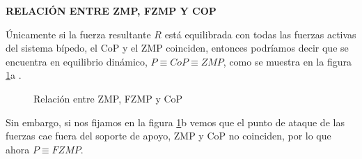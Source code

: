 \textbf{RELACIÓN ENTRE ZMP, FZMP Y COP}

Únicamente si la fuerza resultante $R$ está equilibrada con todas las fuerzas activas del sistema bípedo, el CoP y el ZMP coinciden, entonces podríamos decir que se encuentra en equilibrio dinámico, $P \equiv CoP \equiv ZMP$, como se muestra en la figura \ref{figura224}a \cite{ref24}. 

\begin{figure}[H]
\centering
{}
\quad
{}
\caption{Relación entre ZMP, FZMP y CoP}
\label{figura224}
\end{figure}

Sin embargo, si nos fijamos en la figura \ref{figura224}b vemos que el punto de ataque de las fuerzas cae fuera del soporte de apoyo, ZMP y CoP no coinciden, por lo que ahora $P \equiv FZMP$.

\afterpage{\null\newpage}
\newpage



